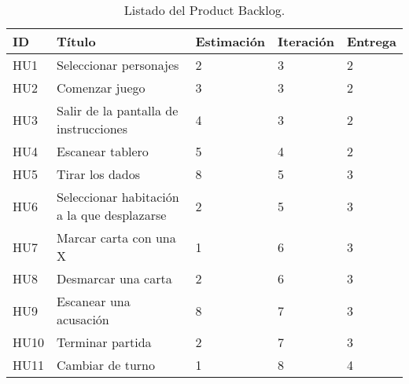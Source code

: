 \begin{table}[h]
  \begin{center}
    \begin{tabular}{|p{1cm}|p{7.5cm}|p{1.9cm}|p{1.6cm}|p{1.6cm}|}

      \hline
        \rowcolor{Gray} \textbf{ID}
        & \textbf{Título}
        & \textbf{Estimación}
        & \textbf{Iteración}
        & \textbf{Entrega}\\

      \hline
      HU1
      & Seleccionar personajes
      & 2
      & 3
      & 2\\

      \hline
      HU2
      & Comenzar juego
      & 3
      & 3
      & 2\\

      \hline
      HU3
      & Salir de la pantalla de instrucciones
      & 4
      & 3
      & 2\\

      \hline
      HU4
      & Escanear tablero
      & 5
      & 4
      & 2\\

      \hline
      HU5
      & Tirar los dados
      & 8
      & 5
      & 3\\

      \hline
      HU6
      & Seleccionar habitación a la que desplazarse
      & 2
      & 5
      & 3\\

      \hline
      HU7
      & Marcar carta con una X
      & 1
      & 6
      & 3\\

      \hline
      HU8
      & Desmarcar una carta
      & 2
      & 6
      & 3\\

      \hline
      HU9
      & Escanear una acusación
      & 8
      & 7
      & 3\\

      \hline
      HU10
      & Terminar partida
      & 2
      & 7
      & 3\\

      \hline
      HU11
      & Cambiar de turno
      & 1
      & 8
      & 4\\

      \hline

    \end{tabular}

    \caption{Listado del Product Backlog.}
    \label{tabla-product-backlog}

  \end{center}
\end{table}

